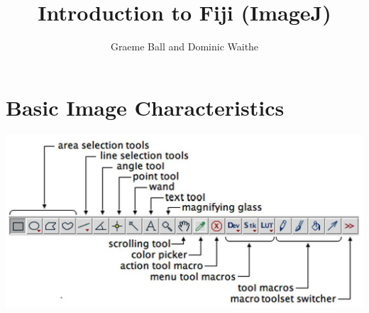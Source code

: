 \documentclass[a4paper,oneside,article]{memoir}
\title{Introduction to Fiji (ImageJ)}
\author{Graeme Ball and Dominic Waithe}
\date{}
\begin{document}
  \maketitle

  \chapter{Basic Image Characteristics}

    \includegraphics[width=\textwidth]{ImageJ-toolbar.jpeg}
\end{document}
